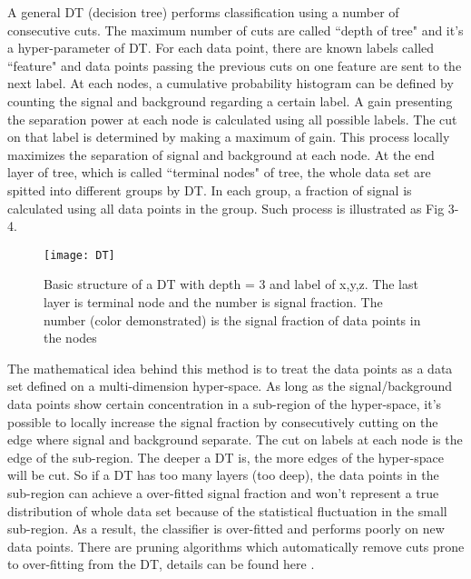 A general DT (decision tree) performs classification using a number of consecutive cuts. The maximum number of cuts are called ``depth of tree" and it's a hyper-parameter of DT. For each data point, there are known labels called ``feature" and data points passing the previous cuts on one feature are sent to the next label. At each nodes, a cumulative probability histogram can be defined by counting the signal and background regarding a certain label. A gain presenting the separation power at each node is calculated using all possible labels. The cut on that label is determined by making a maximum of gain. This process locally maximizes the separation of signal and background at each node. At the end layer of tree, which is called ``terminal nodes" of tree, the whole data set are spitted into different groups by DT. In each group, a fraction of signal is calculated using all data points in the group. Such process is illustrated as Fig 3-4. 

\begin{figure}[htpb]
	\centering 
	\texttt{[image: DT]}
	\caption{Basic structure of a DT with depth = 3 and label of x,y,z. The last layer is terminal node and the number is signal fraction. The number (color demonstrated) is the signal fraction of data points in the nodes}
\end{figure}

The mathematical idea behind this method is to treat the data points as a data set defined on a multi-dimension hyper-space. As long as the signal/background data points show certain concentration in a sub-region of the hyper-space, it's possible to locally increase the signal fraction by consecutively cutting on the edge where signal and background separate. The cut on labels at each node is the edge of the sub-region. The deeper a DT is, the more edges of the hyper-space will be cut. So if a DT has too many layers (too deep), the data points in the sub-region can achieve a over-fitted signal fraction and won't represent a true distribution of whole data set because of the statistical fluctuation in the small sub-region. As a result, the classifier is over-fitted and performs poorly on new data points. There are pruning algorithms which automatically remove cuts prone to over-fitting
from the DT, details can be found here \cite{olshen1984classification}.

